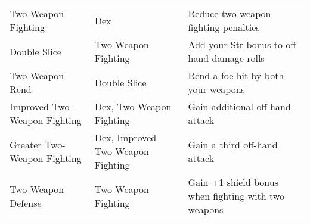 \begin{table*}
\begin{tabularx}{\linewidth}{lXl}
Two-Weapon Fighting & Dex & Reduce two-weapon fighting penalties\\
\quad Double Slice & Two-Weapon Fighting & Add your Str bonus to off-hand damage rolls\\
\quad \quad Two-Weapon Rend & Double Slice & Rend a foe hit by both your weapons\\
\quad Improved Two-Weapon Fighting & Dex, Two-Weapon Fighting & Gain additional off-hand attack\\
\quad \quad Greater Two-Weapon Fighting & Dex, Improved Two-Weapon Fighting & Gain a third off-hand attack\\
\quad Two-Weapon Defense & Two-Weapon Fighting & Gain +1 shield bonus when fighting with two weapons\\
\end{tabularx}
\end{table*}
